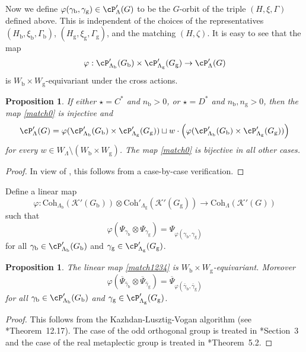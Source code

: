 \documentclass[12pt]{amsart}
\newcommand{\CK}{{\mathcal {K}}}
\newcommand{\be}{\begin {equation}}
\newcommand{\ee}{\end {equation}}
\numberwithin{equation}{section}
\newtheorem{prop}[thm]{Proposition}
\theoremstyle{remark}
\def\Coh{\mathrm{Coh}}
\begin{document}
Now we define  $\varphi(\gamma_\mathrm b, \gamma_\mathrm g) \in\cP'_{\Lambda}(G)$ to be the $G$-orbit of the triple  $(H, \xi, \Gamma)$ defined above.
This is independent of the choices of the representatives $(H_\mathrm b, \xi_\mathrm b, \Gamma_\mathrm b)$, $(H_\mathrm g, \xi_\mathrm g, \Gamma_\mathrm g)$, and the matching $(H, \zeta)$. It is easy to see that the map
\be\label{match0}
  \varphi: \cP'_{\Lambda_\mathrm b}(G_\mathrm b)\times \cP'_{\Lambda_\mathrm g}(G_\mathrm g)\rightarrow \cP'_{\Lambda}(G)
\ee
is $W_\mathrm b\times W_\mathrm g$-equivariant under the cross actions.






 \begin{prop}\label{para}
 If either $\star=C^*$ and $n_\mathrm b>0$, or $\star=D^*$ and $n_\mathrm b, n_\mathrm g>0$, then the map \eqref{match0} is injective and
 \[
   \cP'_{\Lambda}(G)=\varphi(\cP'_{\Lambda_\mathrm b}(G_\mathrm b)\times \cP'_{\Lambda_\mathrm g}(G_\mathrm g))\sqcup w\cdot\left(\varphi(\cP'_{\Lambda_\mathrm b}(G_\mathrm b)\times \cP'_{\Lambda_\mathrm g}(G_\mathrm g))\right)
 \]
 for every $w\in W_\Lambda\setminus (W_\mathrm b\times W_\mathrm g)$. The map \eqref{match0} is bijective in all other cases.
 \end{prop}
 \begin{proof}
  In view of , this follows from a case-by-case verification.
 \end{proof}

Define a linear map
\be\label{match1234}
  \varphi: \Coh_{\Lambda_\mathrm b}(\CK'(G_\mathrm b))\otimes \Coh'_{\Lambda_\mathrm g}(\CK'(G_\mathrm g))\rightarrow \Coh_{\Lambda}(\CK'(G))
\ee
such that
\[
 \varphi(\Psi_{\gamma_\mathrm b}\otimes \Psi_{\gamma_\mathrm g})=\Psi_{\varphi(\gamma_\mathrm b, \gamma_\mathrm g)}
\]
for all $\gamma_\mathrm b \in\cP'_{\Lambda_\mathrm b}(G_\mathrm b)$ and $\gamma_\mathrm g \in\cP'_{\Lambda_\mathrm g}(G_\mathrm g)$.


\begin{prop}\label{matchth}
The linear map \eqref{match1234} is $W_\mathrm b\times W_\mathrm g$-equivariant. Moreover
\[
 \varphi(\overline \Psi_{\bar \gamma_\mathrm b}\otimes \overline \Psi_{\bar \gamma_\mathrm g})=\overline \Psi_{\varphi(\bar \gamma_\mathrm b, \bar \gamma_\mathrm g)}
\]
for all $\gamma_\mathrm b \in\cP'_{\Lambda_\mathrm b}(G_\mathrm b)$ and $\gamma_\mathrm g \in\cP'_{\Lambda_\mathrm g}(G_\mathrm g)$.
\end{prop}
\begin{proof}
  This follows from the Kazhdan-Lusztig-Vogan algorithm (see \cite{V4}*{Theorem~12.17}).
  The case of the odd orthogonal group is treated in \cite{GI}*{Section~3} and
  the case of the real metaplectic group is treated in \cite{RT2}*{Theorem~5.2}.
\end{proof}
\end{document}
